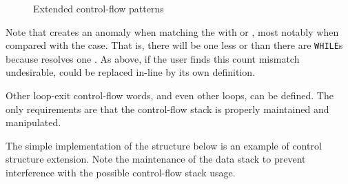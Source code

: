 \begin{figure}[ht]
  \begin{center}
	\caption{Extended control-flow patterns}
	\label{fig:extended}
  \end{center}
\end{figure}

Note that  creates an anomaly when matching the
 with  or , most notably when
compared with the  case. That is,
there will be one less  or  than there are
\texttt{WHILE}s because  resolves one . As
above, if the user finds this count mismatch undesirable, 
could be replaced in-line by its own definition.

Other loop-exit control-flow words, and even other loops, can be
defined. The only requirements are that the control-flow stack is
properly maintained and manipulated.

The simple implementation of the   structure
below is an example of control structure extension. Note the
maintenance of the data stack to prevent interference with the
possible control-flow stack usage.

